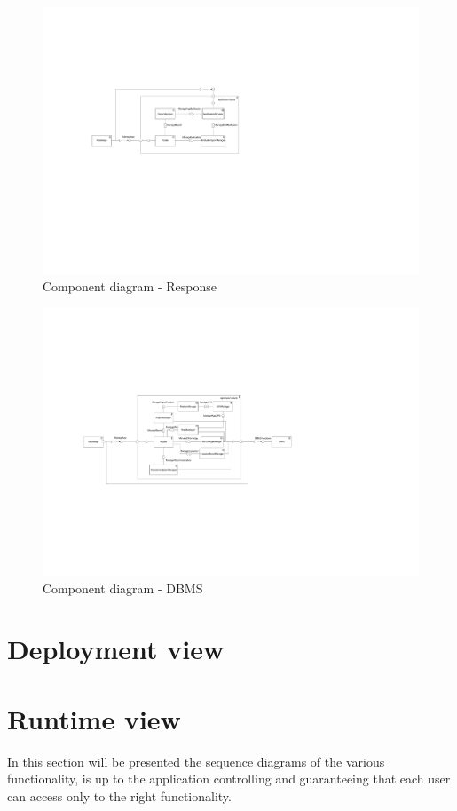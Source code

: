 \documentclass[12pt,a4paper]{report}
\begin{document}
	\begin{figure}[H]
				\includegraphics[scale = 0.5, center]{ComponentDiagramResponse}
				\caption{Component diagram - Response}
	\end{figure}

	\begin{figure}[H]
				\includegraphics[scale = 0.4, center]{ComponentDiagramDBMS}
				\caption{Component diagram - DBMS}
	\end{figure}

		\section{Deployment view}
		\section{Runtime view}
			In this section will be presented the sequence diagrams of the various functionality, is up to the application
			controlling and guaranteeing that each user can access only to the right functionality.
\end{document}
